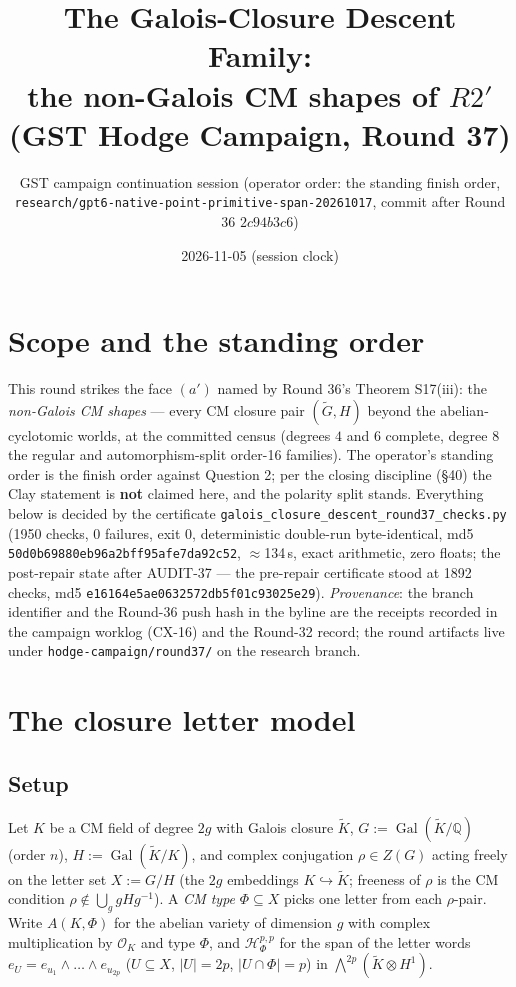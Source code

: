 \documentclass[11pt]{article}
\title{The Galois-Closure Descent Family:\\ the non-Galois CM shapes of $R2'$ (GST Hodge Campaign, Round 37)}
\author{GST campaign continuation session (operator order: the standing finish order,\\
\texttt{research/gpt6-native-point-primitive-span-20261017}, commit after Round 36 $2c94b3c6$)}
\date{2026-11-05 (session clock)}
\begin{document}
\maketitle

\section*{Scope and the standing order}

This round strikes the face $(a')$ named by Round 36's Theorem S17(iii): the
\emph{non-Galois CM shapes} --- every CM closure pair $(\widetilde G, H)$ beyond
the abelian-cyclotomic worlds, at the committed census (degrees $4$ and $6$
complete, degree $8$ the regular and automorphism-split order-16 families).
The operator's standing order is the finish order against Question 2; per the
closing discipline (\S40) the Clay statement is \textbf{not} claimed here, and
the polarity split stands. Everything below is decided by the certificate
\texttt{galois\_closure\_descent\_round37\_checks.py} (1950 checks, 0 failures,
exit 0, deterministic double-run byte-identical, md5
\texttt{50d0b69880eb96a2bff95afe7da92c52}, $\approx$134\,s, exact arithmetic,
zero floats; the post-repair state after AUDIT-37 --- the pre-repair
certificate stood at 1892 checks, md5
\texttt{e16164e5ae0632572db5f01c93025e29}).
\emph{Provenance}: the branch identifier and the Round-36 push hash in the
byline are the receipts recorded in the campaign worklog (CX-16) and the
Round-32 record; the round artifacts live under
\texttt{hodge-campaign/round37/} on the research branch.

\section{The closure letter model}

\subsection{Setup}
Let $K$ be a CM field of degree $2g$ with Galois closure $\widetilde K$,
$G := \operatorname{Gal}(\widetilde K/\mathbb Q)$ (order $n$),
$H := \operatorname{Gal}(\widetilde K/K)$, and complex conjugation
$\rho \in Z(G)$ acting freely on the letter set
$X := G/H$ (the $2g$ embeddings $K \hookrightarrow \widetilde K$; freeness of
$\rho$ is the CM condition $\rho \notin \bigcup_g gHg^{-1}$). A \emph{CM type}
$\Phi \subseteq X$ picks one letter from each $\rho$-pair. Write
$A(K,\Phi)$ for the abelian variety of dimension $g$ with complex
multiplication by $\mathcal O_K$ and type $\Phi$, and
$\mathcal H^{p,p}_\Phi$ for the span of the letter words
$e_U = e_{u_1}\wedge\dots\wedge e_{u_{2p}}$ ($U \subseteq X$, $|U| = 2p$,
$|U \cap \Phi| = p$) in $\bigwedge^{2p}(\widetilde K \otimes H^1)$.
\end{document}
